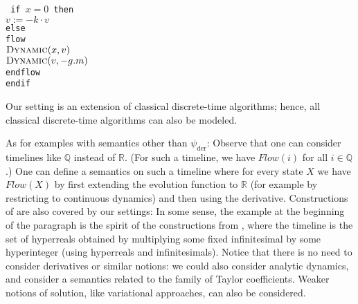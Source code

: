 \documentclass[envcountsame]{llncs}
\newcommand{\Continuous}[1]{\mathit{Flow}(#1)}   \newcommand{\notContinuous}[1]{\mathit{Jump}(#1)}   \newcommand{\Machine}{\textsc{Dynamic}}
\newcommand{\R}{\ensuremath{\mathbb{R}}}
\newenvironment{ttcode}{\begin{ttfamily}\rm\tt}{\end{ttfamily}}
\newcommand\s{\phantom{x}}
\begin{document}
\bigskip

\noindent
\qquad\begin{minipage}{15cm}
\begin{ttcode}
if $x=0$ then \\
\s  $v := -k \cdot v$ \\
else \\
\s flow \\
\s\s   $ \Machine(x,v)$ \\
\s\s $\Machine(v,-g.m)$  \\
\s endflow \\
endif
\end{ttcode}
\end{minipage}

\bigskip

Our setting is an extension of classical discrete-time algorithms; hence, all classical discrete-time algorithms can also be modeled.

 As for examples with semantics other than $ \psi_{\textrm{der}}$:  Observe
  that one can consider timelines like $\mathbb{Q}$ instead of $\R$. (For such
  a timeline, we have $\Continuous{i}$ for all $i \in \mathbb{Q}$.) One
  can define a semantics on such a timeline where for every state $X$
  we have $\Continuous{X}$ by first extending the evolution function
  to $\mathbb{R}$ (for example by
restricting to continuous
  dynamics) and then using the derivative.
Constructions of \cite{rust2000hybrid} are also covered by our
  settings: In some sense, the example at the beginning of the paragraph is the
  spirit of the constructions from \cite{rust2000hybrid}, where the
  timeline is the set of hyperreals obtained by multiplying some fixed
  infinitesimal by some hyperinteger (using hyperreals and
  infinitesimals).
Notice  that there is no need to consider derivatives or similar
notions: we could also consider analytic dynamics, and consider a
semantics related to the family of  Taylor coefficients. Weaker
notions of solution, like variational approaches, can also be considered.









\end{document}
